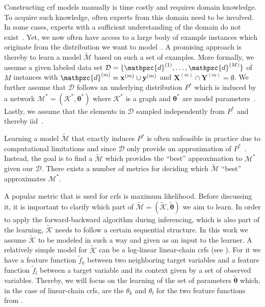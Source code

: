 Constructing \gls{crf} models manually is time costly and requires domain knowledge.
To acquire such knowledge, often experts from this domain need to be involved.
In some cases, experts with a sufficient understanding of the domain do not exist~\citep{koller2009probabilistic}.
Yet, we now often have access to a large body of example instances which originate from the distribution we want to model~\citep{koller2009probabilistic}.
A promising approach is thereby to learn a model $\mathcal{\tilde{M}}$ based on such a set of examples.
More formally, we assume a given labeled data set $\mathcal{D}=\{\mathpzc{d}^{(1)},\dots,\mathpzc{d}^{(M)}\}$ of $M$ instances with $\mathpzc{d}^{(m)}=\mathbf{x}^{(m)}\cup\mathbf{y}^{(m)}$ and $\mathbf{X}^{(m)}\cap\mathbf{Y}^{(m)}=\emptyset$.
We further assume that $\mathcal{D}$ follows an underlying distribution $P^*$ which is induced by a network $\mathcal{M}^*=(\mathcal{K}^*,\bm{\theta}^*)$ where $\mathcal{K}^*$ is a graph and $\bm{\theta}^*$ are model parameters~\citep{koller2009probabilistic}.
Lastly, we assume that the elements in $\mathcal{D}$ sampled independently from $P^*$ and thereby \acrfull{iid}~\citep{koller2009probabilistic}.

\bigskip

Learning a model $\mathcal{\tilde{M}}$ that exactly induces $P^*$ is often unfeasible in practice due to computational limitations and since $\mathcal{D}$ only provide an approximation of $P^*$~\citep{koller2009probabilistic}.
Instead, the goal is to find a $\mathcal{\tilde{M}}$ which provides the ``best'' approximation to $\mathcal{M}^*$ given our $\mathcal{D}$.
There exists a number of metrics for deciding which $\mathcal{\tilde{M}}$ ``best'' approximates $\mathcal{M}^*$.

A popular metric that is used for \glspl{crf} is \gls{maximum likelihood}.
Before discussing it, it is important to clarify which part of $\mathcal{\tilde{M}}=(\mathcal{\tilde{K}},\bm{\tilde{\theta}})$ we aim to learn.
In order to apply the forward-backward algorithm during inferencing, which is also part of the learning, $\mathcal{\tilde{K}}$ needs to follow a certain sequential structure.
In this work we assume $\mathcal{\tilde{K}}$ to be modeled in such a way and given as an input to the learner.
A relatively simple model for $\mathcal{\tilde{K}}$ can be a log-linear \glspl{linear-chain crf} (see ). For it we have a \gls{feature function} $\tilde{f}_k$ between two neighboring \glspl{target variable} and a \gls{feature function} $\tilde{f}_l$ between a \gls{target variable} and its context given by a set of \glspl{observed variable}.
Thereby, we will focus on the learning of the set of parameters $\bm{\tilde{\theta}}$ which, in the case of \glspl{linear-chain crf}, are the $\theta_k$ and $\theta_l$ for the two \glspl{feature function} from .


